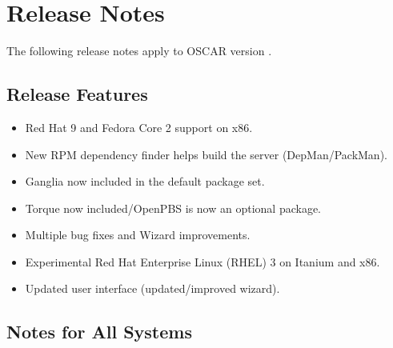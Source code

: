 %
% 
%
%

\section{Release Notes}
\label{sec:release-notes}

The following release notes apply to OSCAR version \oscarversion.
\subsection{Release Features}
\label{subsec:release-features}

\begin{itemize}

\item Red Hat 9 and Fedora Core 2 support on x86.
\item New RPM dependency finder helps build the server (DepMan/PackMan).
\item Ganglia now included in the default package set.
\item Torque now included/OpenPBS is now an optional package.
\item Multiple bug fixes and Wizard improvements.
\item Experimental Red Hat Enterprise Linux (RHEL) 3 on Itanium and x86.
\item Updated user interface (updated/improved wizard). 

\end{itemize}

\subsection{Notes for All Systems}
\label{subsec:release-notes}

